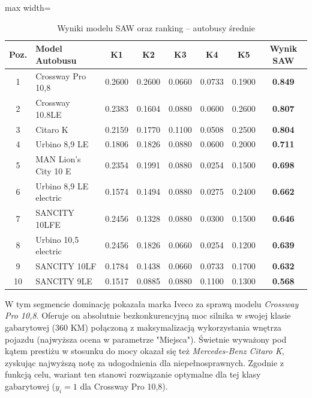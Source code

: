 \begin{table}[H]
    \centering
    \caption{Wyniki modelu SAW oraz ranking -- autobusy średnie}
    \vspace{0.2cm}
    \begin{adjustbox}{max width=\textwidth}
    \begin{tabular}{|c|l|c|c|c|c|c|c|}
        \hline
        \textbf{Poz.} & \textbf{Model Autobusu} & \textbf{K1} & \textbf{K2} & \textbf{K3} & \textbf{K4} & \textbf{K5} & \textbf{Wynik SAW} \\ \hline
        1 & Crossway Pro 10,8 & 0.2600 & 0.2600 & 0.0660 & 0.0733 & 0.1900 & \textbf{0.849} \\ \hline
        2 & Crossway 10.8LE & 0.2383 & 0.1604 & 0.0880 & 0.0600 & 0.2600 & \textbf{0.807} \\ \hline
        3 & Citaro K & 0.2159 & 0.1770 & 0.1100 & 0.0508 & 0.2500 & \textbf{0.804} \\ \hline
        4 & Urbino 8,9 LE & 0.1806 & 0.1826 & 0.0880 & 0.0600 & 0.2000 & \textbf{0.711} \\ \hline
        5 & MAN Lion's City 10 E & 0.2354 & 0.1991 & 0.0880 & 0.0254 & 0.1500 & \textbf{0.698} \\ \hline
        6 & Urbino 8,9 LE electric & 0.1574 & 0.1494 & 0.0880 & 0.0275 & 0.2400 & \textbf{0.662} \\ \hline
        7 & SANCITY 10LFE & 0.2456 & 0.1328 & 0.0880 & 0.0300 & 0.1500 & \textbf{0.646} \\ \hline
        8 & Urbino 10,5 electric & 0.2456 & 0.1826 & 0.0660 & 0.0254 & 0.1200 & \textbf{0.639} \\ \hline
        9 & SANCITY 10LF & 0.1784 & 0.1438 & 0.0660 & 0.0733 & 0.1700 & \textbf{0.632} \\ \hline
        10 & SANCITY 9LE & 0.1517 & 0.0885 & 0.0880 & 0.1100 & 0.1300 & \textbf{0.568} \\ \hline
    \end{tabular}
    \end{adjustbox}
\end{table}

W tym segmencie dominację pokazała marka Iveco za sprawą modelu \textit{Crossway Pro 10,8}. Oferuje on absolutnie bezkonkurencyjną moc silnika w swojej klasie gabarytowej (360 KM) połączoną z maksymalizacją wykorzystania wnętrza pojazdu (najwyższa ocena w parametrze "Miejsca"). Świetnie wyważony pod kątem prestiżu w stosunku do mocy okazał się też \textit{Mercedes-Benz Citaro K}, zyskując najwyższą notę za udogodnienia dla niepełnosprawnych. Zgodnie z funkcją celu, wariant ten stanowi rozwiązanie optymalne dla tej klasy gabarytowej ($y_i = 1$ dla Crossway Pro 10,8).
